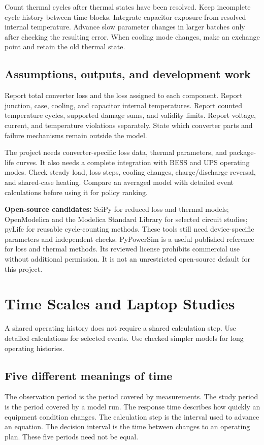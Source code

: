 \documentclass[11pt,a4paper]{report}
\begin{document}
Count thermal cycles after thermal states have been resolved.
Keep incomplete cycle history between time blocks.
Integrate capacitor exposure from resolved internal temperature.
Advance slow parameter changes in larger batches only after checking the resulting error.
When cooling mode changes, make an exchange point and retain the old thermal state.

\section{Assumptions, outputs, and development work}
Report total converter loss and the loss assigned to each component.
Report junction, case, cooling, and capacitor internal temperatures.
Report counted temperature cycles, supported damage sums, and validity limits.
Report voltage, current, and temperature violations separately.
State which converter parts and failure mechanisms remain outside the model.

The project needs converter-specific loss data, thermal parameters, and package-life curves.
It also needs a complete integration with BESS and UPS operating modes.
Check steady load, loss steps, cooling changes, charge/discharge reversal, and shared-case heating.
Compare an averaged model with detailed event calculations before using it for policy ranking.

\textbf{Open-source candidates:} SciPy for reduced loss and thermal models;
OpenModelica and the Modelica Standard Library for selected circuit studies;
pyLife for reusable cycle-counting methods.
These tools still need device-specific parameters and independent checks.
PyPowerSim is a useful published reference for loss and thermal methods.
Its reviewed license prohibits commercial use without additional permission.
It is not an unrestricted open-source default for this project.

\chapter{Time Scales and Laptop Studies}
\label{chap:computing}
A shared operating history does not require a shared calculation step.
Use detailed calculations for selected events.
Use checked simpler models for long operating histories.

\section{Five different meanings of time}
The observation period is the period covered by measurements.
The study period is the period covered by a model run.
The response time describes how quickly an equipment condition changes.
The calculation step is the interval used to advance an equation.
The decision interval is the time between changes to an operating plan.
These five periods need not be equal.
\end{document}
